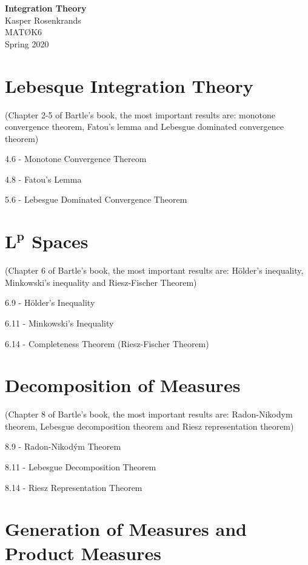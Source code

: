 \documentclass{article}
\begin{document}
\thispagestyle{empty}
\begin{center}
{\huge\textbf{Integration Theory}}\\[2mm]
{\Large Kasper Rosenkrands}\\[2cm]
{\large MATØK6}\\[2mm]
{\large Spring 2020}
\end{center}

\newpage


\section{Lebesque Integration Theory}
(Chapter 2-5 of Bartle's book, the most important results are: monotone convergence theorem, Fatou's lemma and Lebesgue dominated convergence theorem)

4.6 - Monotone Convergence Thereom 

4.8 - Fatou's Lemma

5.6 - Lebesgue Dominated Convergence Theorem

\newpage

\section{$\mathbf{L^p}$ Spaces}
(Chapter 6 of Bartle's book, the most important results are: Hölder's inequality, Minkowski's inequality and Riesz-Fischer Theorem)

6.9 - Hölder's Inequality

6.11 - Minkowski's Inequality

6.14 - Completeness Theorem (Riesz-Fischer Theorem)

\newpage

\section{Decomposition of Measures}
(Chapter 8 of Bartle's book, the most important results are: Radon-Nikodym theorem, Lebesgue decomposition theorem and Riesz representation theorem)

8.9 - Radon-Nikodým Theorem

8.11 - Lebesgue Decomposition Theorem

8.14 - Riesz Representation Theorem

\newpage

\section{Generation of Measures and Product Measures}
\end{document}
